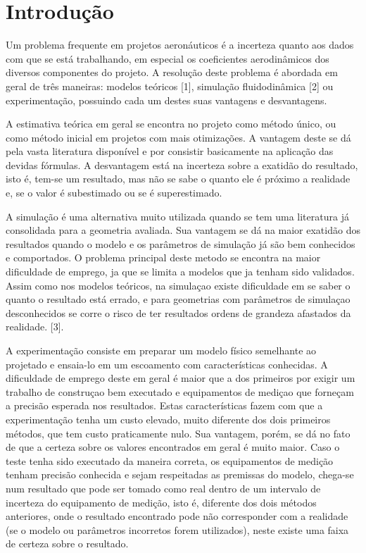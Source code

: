 \chapter{Introdução}\label{chp:intro}

Um problema frequente em projetos aeronáuticos é a incerteza quanto aos dados com que se está trabalhando, em especial os coeficientes aerodinâmicos dos diversos componentes do projeto. A resolução deste problema é abordada em geral de três maneiras: modelos teóricos [1], simulação fluidodinâmica [2] ou experimentação, possuindo cada um destes suas vantagens e desvantagens.

A estimativa teórica em geral se encontra no projeto como método único, ou como método inicial em projetos com mais otimizações. A vantagem deste se dá pela vasta literatura disponível e por consistir basicamente na aplicação das devidas fórmulas. A desvantagem está na incerteza sobre a exatidão do resultado, isto é, tem-se um resultado, mas não se sabe o quanto ele é próximo a realidade e, se o valor é subestimado ou se é superestimado.

A simulação é uma alternativa muito utilizada quando se tem uma literatura já consolidada para a geometria avaliada. Sua vantagem se dá na maior exatidão dos resultados quando o modelo e os parâmetros de simulação já são bem conhecidos e comportados. O problema principal deste metodo se encontra na maior dificuldade de emprego, ja que se limita a modelos que ja tenham sido validados. Assim como nos modelos teóricos, na simulaçao existe dificuldade em se saber o quanto o resultado está errado, e para geometrias com parâmetros de simulaçao desconhecidos se corre o risco de ter resultados ordens de grandeza afastados da realidade. [3].

A experimentação consiste em preparar um modelo físico semelhante ao projetado e ensaia-lo em um escoamento com características conhecidas. A dificuldade de emprego deste em geral é maior que a dos primeiros por exigir um trabalho de construçao bem executado e equipamentos de mediçao que forneçam a precisão esperada nos resultados. Estas características fazem com que a experimentação tenha um custo elevado, muito diferente dos dois primeiros métodos, que tem custo praticamente nulo. Sua vantagem, porém, se dá no fato de que a certeza sobre os valores encontrados em geral é muito maior. Caso o teste tenha sido executado da maneira correta, os equipamentos de medição tenham precisão conhecida e sejam respeitadas as premissas do modelo, chega-se num resultado que pode ser tomado como real dentro de um intervalo de incerteza do equipamento de medição, isto é, diferente dos dois métodos anteriores, onde o resultado encontrado pode não corresponder com a realidade (se o modelo ou parâmetros incorretos forem utilizados), neste existe uma faixa de certeza sobre o resultado.

